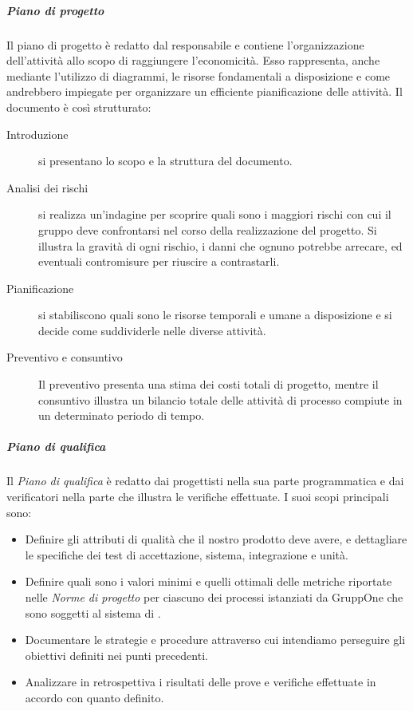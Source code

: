 \documentclass[../norme-di-progetto.tex]{subfiles}
\begin{document}
\subparagraph{Piano di progetto}%
\label{subp:piano_di_progetto}
Il piano di progetto è redatto dal responsabile e contiene l'organizzazione dell'attività allo scopo di raggiungere l'economicità.
Esso rappresenta, anche mediante l'utilizzo di diagrammi, le risorse fondamentali a disposizione e come andrebbero impiegate per organizzare un efficiente pianificazione delle attività.
Il documento è così strutturato:
\begin{description}
  \item [Introduzione] si presentano lo scopo e la struttura del documento.
  \item [Analisi dei rischi] si realizza un'indagine per scoprire quali sono i maggiori rischi con cui il gruppo deve confrontarsi nel corso della realizzazione del progetto. Si illustra la gravità di ogni rischio, i danni che ognuno potrebbe arrecare, ed eventuali contromisure per riuscire a contrastarli.
  \item [Pianificazione] si stabiliscono quali sono le risorse temporali e umane a disposizione e si decide come suddividerle nelle diverse attività.
  \item [Preventivo e consuntivo] Il preventivo presenta una stima dei costi totali di progetto, mentre il consuntivo illustra un bilancio totale delle attività di processo compiute in un determinato periodo di tempo.
\end{description}

\subparagraph{Piano di qualifica}%
\label{subp:piano_di_qualifica}
Il \textit{Piano di qualifica} è redatto dai progettisti nella sua parte programmatica e dai verificatori nella parte che illustra le verifiche effettuate.
I suoi scopi principali sono:

\begin{itemize}
  \item Definire gli attributi di qualità che il nostro prodotto deve avere, e dettagliare le specifiche dei test di accettazione, sistema, integrazione e unità.
  \item Definire quali sono i valori minimi e quelli ottimali delle metriche riportate nelle \textit{Norme di progetto} per ciascuno dei processi istanziati da GruppOne che sono soggetti al sistema di .
  \item Documentare le strategie e procedure attraverso cui intendiamo perseguire gli obiettivi definiti nei punti precedenti.
  \item Analizzare in retrospettiva i risultati delle prove e verifiche effettuate in accordo con quanto definito.
\end{itemize}
\end{document}
